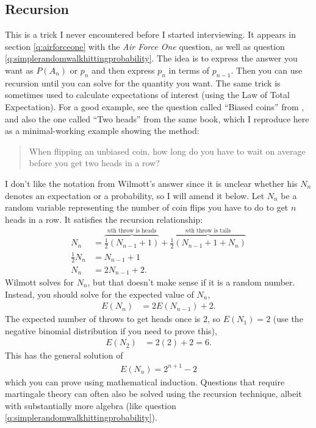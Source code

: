 \documentclass[a4paper]{article}
\begin{document}
\subsection{Recursion}
This is a trick I never encountered before I started interviewing.
It appears in section \ref{q:airforceone} with the \emph{Air Force One} question, as well as question \ref{q:simplerandomwalkhittingprobability}.
The idea is to express the answer you want as $P(A_n)$ or $p_n$ and then express $p_n$ in terms of $p_{n-1}$.
Then you can use recursion until you can solve for the quantity you want.
The same trick is sometimes used to calculate expectations of interest (using the Law of Total Expectation).
For a good example, see the question called ``Biased coins'' from \citet{WilmottFAQ}, and also the one called ``Two heads'' from the same book, which I reproduce here as a minimal-working example showing the method:

\begin{quote}
 When flipping an unbiased coin, how long do you have to wait on average before you get two heads in a row?
\end{quote}
I don't like the notation from Wilmott's answer since it is unclear whether his $N_n$ denotes an expectation or a probability, so I will amend it below.
Let $N_n$ be a random variable representing the number of coin flips you have to do to get $n$ heads in a row.
It satisfies the recursion relationship:
\begin{align*}
  N_n &=
  \overbrace{ \frac{1}{2} (N_{n-1} + 1)}^{n\text{th throw is heads}}
  +
  \overbrace{\frac{1}{2} (N_{n-1} + 1 + N_n)}^{n\text{th throw is tails}}
  \\
  \frac{1}{2}  N_n &=
   N_{n-1} + 1
  \\
  N_n &=
  2 N_{n-1} + 2
  \text{.}
\end{align*}
Wilmott solves for $N_n$, but that doesn't make sense if it is a random number.
Instead, you should solve for the expected value of $N_n$,
\begin{align*}
  E(N_n) &= 2 E(N_{n-1}) + 2
  \text{.}
\end{align*}
The expected number of throws to get heads once is $2$, so
$E(N_1) = 2$ (use the negative binomial distribution if you need to prove this),
\begin{align*}
  E(N_2) &= 2(2) + 2 = 6
  \text{.}
\end{align*}
This has the general solution of
\begin{align*}
  E(N_n) = 2^{n+1} - 2
\end{align*}
which you can prove using mathematical induction.
Questions that require martingale theory can often also be solved using the recursion technique, albeit with substantially more algebra (like question \ref{q:simplerandomwalkhittingprobability}).
\end{document}
